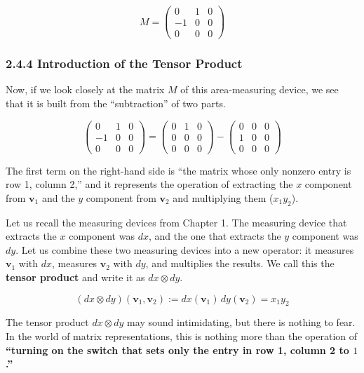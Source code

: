 \documentclass[a4paper,12pt,openany]{book}
\begin{document}
\[
M = \begin{pmatrix}
  0 & 1 & 0 \\
  -1 & 0 & 0 \\
  0 & 0 & 0
\end{pmatrix}
\]

\hypertarget{introduction-of-the-tensor-product}{%
\subsubsection{2.4.4 Introduction of the Tensor
Product}\label{introduction-of-the-tensor-product}}

Now, if we look closely at the matrix \(M\) of this area-measuring
device, we see that it is built from the ``subtraction'' of two parts.

\[
\begin{pmatrix} 0 & 1 & 0 \\ -1 & 0 & 0 \\ 0 & 0 & 0 \end{pmatrix}
= \begin{pmatrix} 0 & 1 & 0 \\ 0 & 0 & 0 \\ 0 & 0 & 0 \end{pmatrix} -
\begin{pmatrix} 0 & 0 & 0 \\ 1 & 0 & 0 \\ 0 & 0 & 0 \end{pmatrix}
\]

The first term on the right-hand side is ``the matrix whose only nonzero
entry is row 1, column 2,'' and it represents the operation of
extracting the \(x\) component from \(\mathbf{v}_1\) and the \(y\)
component from \(\mathbf{v}_2\) and multiplying them (\(x_1 y_2\)).

Let us recall the measuring devices from Chapter 1. The measuring device
that extracts the \(x\) component was \(dx\), and the one that extracts
the \(y\) component was \(dy\). Let us combine these two measuring
devices into a new operator: it measures \(\mathbf{v}_1\) with \(dx\),
measures \(\mathbf{v}_2\) with \(dy\), and multiplies the results. We
call this the \textbf{tensor product} and write it as \(dx \otimes dy\).

\[(dx \otimes dy)(\mathbf{v}_1, \mathbf{v}_2) := dx(\mathbf{v}_1)\,dy(\mathbf{v}_2) = x_1 y_2\]

The tensor product \(dx \otimes dy\) may sound intimidating, but there
is nothing to fear. In the world of matrix representations, this is
nothing more than the operation of \textbf{``turning on the switch that
sets only the entry in row 1, column 2 to \(1\).''}
\end{document}
